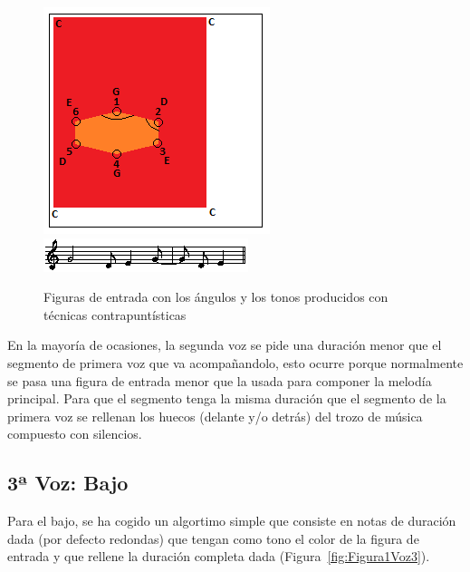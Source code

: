 		\begin{figure}[htbp]
		\centering
		\hspace*{0.0in}
		\includegraphics[scale=1]{graphics/simpletest4-F3_2.png}
		\includegraphics[scale=1]{graphics/simpletest4-F3_2-MEL2partitura.png}
		\caption{Figuras de entrada con los ángulos y los tonos producidos con técnicas contrapuntísticas}
		\label{fig:Figura4Voz2}
		\end{figure}

En la mayoría de ocasiones, la segunda voz se pide una duración menor que el segmento de primera voz que va acompañandolo, esto ocurre porque normalmente se pasa una figura de entrada menor que la usada para componer la melodía principal. Para que el segmento tenga la misma duración que el segmento de la primera voz se rellenan los huecos (delante y/o detrás) del trozo de música compuesto con silencios.


\subsection{3ª Voz: Bajo}

Para el bajo, se ha cogido un algortimo simple que consiste en notas de duración dada (por defecto redondas) que tengan como tono el color de la figura de entrada y que rellene la duración completa dada (Figura~\ref{fig:Figura1Voz3}).

